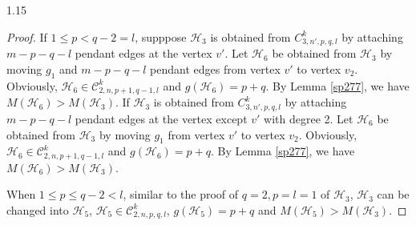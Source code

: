 \documentclass[preprint,12pt]{elsarticle1}
\numberwithin{equation}{section}
\begin{document}
\begin{spacing}{1.15}
\begin{proof}
If $1\leq p<q-2=l$,
supppose $\mathcal{H}_{3}$ is obtained from $C_{3,n',p,q,l}^{k}$ by attaching $m-p-q-l$ pendant edges at the vertex $v'$. Let $\mathcal{H}_{6}$ be obtained from $\mathcal{H}_{3}$ by moving $g_{1}$ and $m-p-q-l$ pendant edges from vertex $v'$ to vertex $v_{2}$. Obviously, $\mathcal{H}_{6}\in \mathcal{C}_{2,n,p+1,q-1,l}^{k}$ and $g(\mathcal{H}_{6})=p+q$. By Lemma \ref{sp277}, we have $M(\mathcal{H}_{6})>M(\mathcal{H}_{3})$.
If $\mathcal{H}_{3}$ is obtained from $C_{3,n',p,q,l}^{k}$ by attaching $m-p-q-l$ pendant edges at the vertex except $v'$ with degree 2.  Let $\mathcal{H}_{6}$ be obtained from $\mathcal{H}_{3}$ by moving $g_{1}$
from vertex $v'$ to vertex $v_{2}$. Obviously, $\mathcal{H}_{6}\in \mathcal{C}_{2,n,p+1,q-1,l}^{k}$ and $g(\mathcal{H}_{6})=p+q$. By Lemma \ref{sp277}, we have $M(\mathcal{H}_{6})>M(\mathcal{H}_{3})$.

When $1\leq p\leq q-2<l$, similar to the proof of $q=2, p=l=1$ of $\mathcal{H}_{3}$, $\mathcal{H}_{3}$ can be changed into $\mathcal{H}_{5}$,
$\mathcal{H}_{5}\in \mathcal{C}_{2,n,p,q,l}^{k}$, $g(\mathcal{H}_{5})=p+q$ and $M(\mathcal{H}_{5})>M(\mathcal{H}_{3})$.







\end{proof}
\end{spacing}
\end{document}
